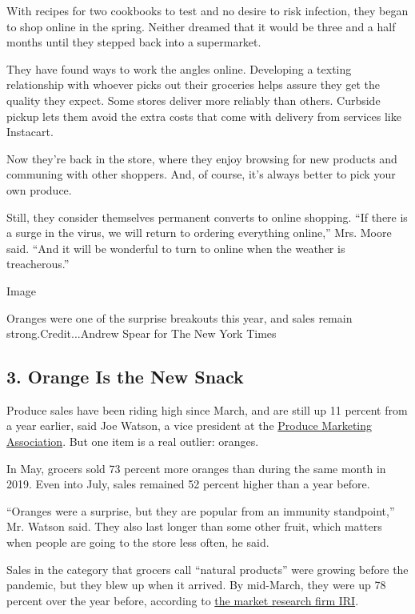 With recipes for two cookbooks to test and no desire to risk infection,
they began to shop online in the spring. Neither dreamed that it would
be three and a half months until they stepped back into a supermarket.

They have found ways to work the angles online. Developing a texting
relationship with whoever picks out their groceries helps assure they
get the quality they expect. Some stores deliver more reliably than
others. Curbside pickup lets them avoid the extra costs that come with
delivery from services like Instacart.

Now they're back in the store, where they enjoy browsing for new
products and communing with other shoppers. And, of course, it's always
better to pick your own produce.

Still, they consider themselves permanent converts to online shopping.
``If there is a surge in the virus, we will return to ordering
everything online,'' Mrs. Moore said. ``And it will be wonderful to turn
to online when the weather is treacherous.''

Image

Oranges were one of the surprise breakouts this year, and sales remain
strong.Credit...Andrew Spear for The New York Times

\hypertarget{3-orange-is-the-new-snack}{%
\subsection{3. Orange Is the New
Snack}\label{3-orange-is-the-new-snack}}

Produce sales have been riding high since March, and are still up 11
percent from a year earlier, said Joe Watson, a vice president at the
\href{https://www.pma.com/}{Produce Marketing Association}. But one item
is a real outlier: oranges.

In May, grocers sold 73 percent more oranges than during the same month
in 2019. Even into July, sales remained 52 percent higher than a year
before.

``Oranges were a surprise, but they are popular from an immunity
standpoint,'' Mr. Watson said. They also last longer than some other
fruit, which matters when people are going to the store less often, he
said.

Sales in the category that grocers call ``natural products'' were
growing before the pandemic, but they blew up when it arrived. By
mid-March, they were up 78 percent over the year before, according to
\href{https://www.theshelbyreport.com/2020/06/09/natural-product-sales-up-significantly/}{the
market research firm IRI}.

